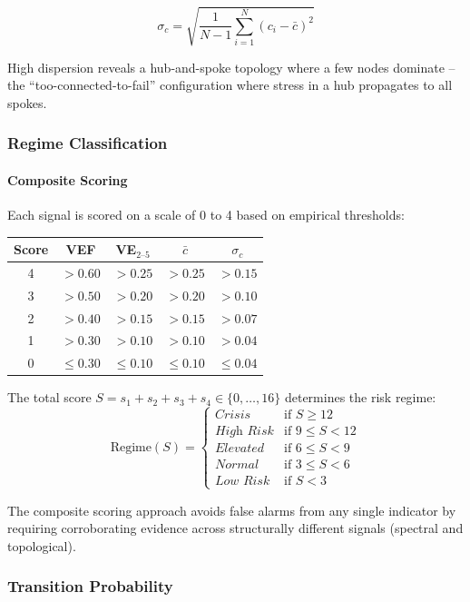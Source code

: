\[
\sigma_c = \sqrt{\frac{1}{N-1} \sum_{i=1}^{N} (c_i - \bar{c})^2}
\]

High dispersion reveals a hub-and-spoke topology where a few nodes dominate -- the ``too-connected-to-fail'' configuration where stress in a hub propagates to all spokes.

\subsubsection{Regime Classification}

\paragraph{Composite Scoring}

Each signal is scored on a scale of 0 to 4 based on empirical thresholds:

\begin{center}
\begin{tabular}{c|cccc}
Score & VEF & VE$_{2\text{--}5}$ & $\bar{c}$ & $\sigma_c$ \\
\hline
4 & $> 0.60$ & $> 0.25$ & $> 0.25$ & $> 0.15$ \\
3 & $> 0.50$ & $> 0.20$ & $> 0.20$ & $> 0.10$ \\
2 & $> 0.40$ & $> 0.15$ & $> 0.15$ & $> 0.07$ \\
1 & $> 0.30$ & $> 0.10$ & $> 0.10$ & $> 0.04$ \\
0 & $\leq 0.30$ & $\leq 0.10$ & $\leq 0.10$ & $\leq 0.04$
\end{tabular}
\end{center}

The total score $S = s_1 + s_2 + s_3 + s_4 \in \{0, \ldots, 16\}$ determines the risk regime:
\[
\text{Regime}(S) = \begin{cases}
\textit{Crisis} & \text{if } S \geq 12 \\
\textit{High Risk} & \text{if } 9 \leq S < 12 \\
\textit{Elevated} & \text{if } 6 \leq S < 9 \\
\textit{Normal} & \text{if } 3 \leq S < 6 \\
\textit{Low Risk} & \text{if } S < 3
\end{cases}
\]

The composite scoring approach avoids false alarms from any single indicator by requiring corroborating evidence across structurally different signals (spectral and topological).

\subsubsection{Transition Probability}

